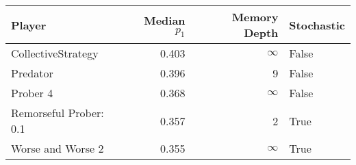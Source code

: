 \begin{tabular}{lrrl}
\toprule
                 Player &  Median $p_1$ &  Memory Depth & Stochastic \\
\midrule
     CollectiveStrategy &         0.403 &            \(\infty\) &      False \\
               Predator &         0.396 &             9 &      False \\
               Prober 4 &         0.368 &            \(\infty\) &      False \\
 Remorseful Prober: 0.1 &         0.357 &             2 &       True \\
      Worse and Worse 2 &         0.355 &            \(\infty\) &       True \\
\bottomrule
\end{tabular}
